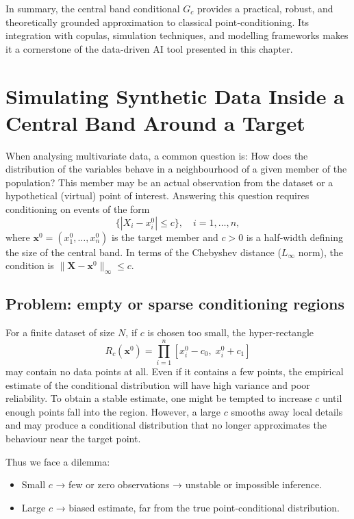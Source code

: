 In summary, the central band conditional $G_c$ provides a practical, robust, and theoretically grounded approximation to classical point‑conditioning. Its integration with copulas, simulation techniques, and modelling frameworks makes it a cornerstone of the data‑driven AI tool presented in this chapter.

\section{Simulating Synthetic Data Inside a Central Band Around a Target}
\label{sec:simulate-central-band}

When analysing multivariate data, a common question is: How does the distribution of the variables behave in a neighbourhood of a given member of the population? This member may be an actual observation from the dataset or a hypothetical (virtual) point of interest. Answering this question requires conditioning on events of the form
\[
\bigl\{ |X_i - x_i^0| \le c \bigr\},\quad i=1,\dots,n,
\]
where $\mathbf{x}^0 = (x_1^0,\dots,x_n^0)$ is the target member and $c>0$ is a half‑width defining the size of the central band. In terms of the Chebyshev distance ($L_\infty$ norm), the condition is $\|\mathbf{X} - \mathbf{x}^0\|_\infty \le c$.

\subsection{Problem: empty or sparse conditioning regions}

For a finite dataset of size $N$, if $c$ is chosen too small, the hyper‑rectangle
\[
R_c(\mathbf{x}^0) = \prod_{i=1}^n [x_i^0 - c_0,\; x_i^0 + c_1]
\]
may contain no data points at all. Even if it contains a few points, the empirical estimate of the conditional distribution will have high variance and poor reliability. To obtain a stable estimate, one might be tempted to increase $c$ until enough points fall into the region. However, a large $c$ smooths away local details and may produce a conditional distribution that no longer approximates the behaviour near the target point.

Thus we face a dilemma:
\begin{itemize}
    \item Small $c$ → few or zero observations → unstable or impossible inference.
    \item Large $c$ → biased estimate, far from the true point‑conditional distribution.
\end{itemize}

